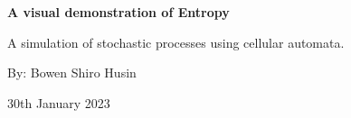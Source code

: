 \begin{titlepage}
    \begin{center} 
       \vspace*{1cm}
       
       \textbf{ \LARGE A visual demonstration of Entropy}

       \vspace{6.5cm}
       \large{A simulation of stochastic processes using cellular automata}.


       \vspace{7.0cm}
       \large{By: Bowen Shiro Husin} \par
       
       \vspace{0.3cm}
       30th January 2023

    
        
    \end{center}
\end{titlepage}